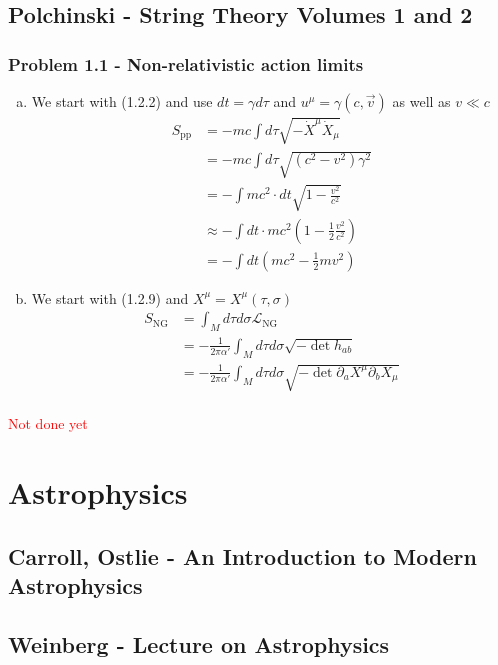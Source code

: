 \documentclass[10pt,a4paper]{book}
\theoremstyle{definition}
\begin{document}
\section{{\sc Polchinski} - String Theory Volumes 1 and 2 }
\subsection{Problem 1.1 - Non-relativistic action limits}
\begin{enumerate}[(a)]
    \item We start with (1.2.2) and use $dt=\gamma d\tau$ and $u^\mu=\gamma(c,\vec{v})$ as well as $v\ll c$
    \begin{align}
        S_\text{pp}&=-mc\int d\tau\sqrt{-\dot X^\mu\dot X_\mu}\\
        &=-mc\int d\tau\sqrt{(c^2-v^2)\gamma^2}\\
        &=-\int mc^2\cdot dt\sqrt{1-\frac{v^2}{c^2}}\\
        &\approx-\int dt\cdot mc^2\left(1-\frac{1}{2}\frac{v^2}{c^2}\right)\\
        &=-\int dt\left(mc^2-\frac{1}{2}mv^2\right)
    \end{align}
    
    \item We start with (1.2.9) and $X^\mu=X^\mu(\tau,\sigma)$
    \begin{align}
        S_\text{NG}
        &=\int_Md\tau d\sigma \mathcal{L}_\text{NG}\\
        &=-\frac{1}{2\pi\alpha'}\int_Md\tau d\sigma \sqrt{-\det h_{ab}}\\
        &=-\frac{1}{2\pi\alpha'}\int_Md\tau d\sigma \sqrt{-\det \partial_aX^\mu\partial_bX_\mu}\\
    \end{align}
    
\end{enumerate}

\textcolor{red}{Not done yet}

\chapter{Astrophysics}
\section{{\sc Carroll, Ostlie} - An Introduction to Modern Astrophysics}

\section{{\sc Weinberg} - Lecture on Astrophysics}
\end{document}
